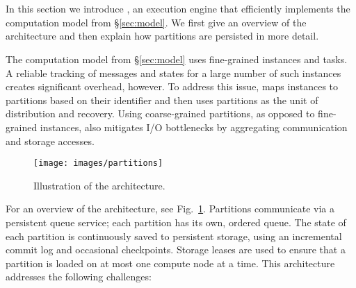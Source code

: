 \section{\sys}
\label{sec:netherite}

In this section we introduce \sys, an execution engine that efficiently implements the computation model from \S\ref{sec:model}. We first give an overview of the \sys architecture and then explain how partitions are persisted in more detail.

The computation model from \S\ref{sec:model} uses fine-grained instances and tasks. A reliable tracking of messages and states for a large number of such instances creates significant overhead, however. To address this issue, \sys maps instances to partitions based on their identifier and then uses partitions as the unit of distribution and recovery. Using coarse-grained partitions, as opposed to fine-grained instances, also mitigates I/O bottlenecks by aggregating communication and storage accesses. 

\begin{figure}
    \centering
    \texttt{[image: images/partitions]}
    \caption{Illustration of the \sys architecture.}
    \label{fig:partitions}
\end{figure}
For an overview of the architecture, see Fig.~\ref{fig:partitions}. Partitions communicate via a persistent queue service; each partition has its own, ordered queue. The state of each partition is continuously saved to persistent storage, using an incremental commit log and occasional checkpoints. Storage leases are used to ensure that a partition is loaded on at most one compute node at a time.
%
This architecture addresses the following challenges:

